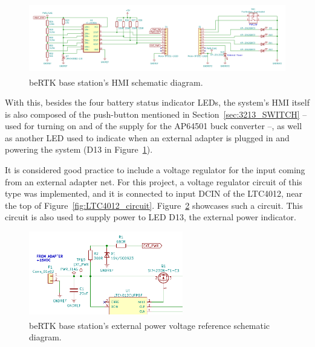 \begin{figure}[h]
	\centering
	\includegraphics[width=1.0\textwidth]{Chapters/Figures/chapter3/Back_Panel.pdf}
	\caption{beRTK\textsuperscript{\textregistered} base station's HMI schematic diagram.}
	\label{fig:HMI_circuit}
\end{figure}

With this, besides the four battery status indicator LEDs, the system's HMI itself is also composed of the push-button mentioned in Section~\ref{sec:3213_SWITCH} -- used for turning on and of the supply for the AP64501 buck converter --, as well as another LED used to indicate when an external adapter is plugged in and powering the system (D13 in Figure~\ref{fig:HMI_circuit}).

It is considered good practice to include a voltage regulator for the input coming from an external adapter net. For this project, a voltage regulator circuit of this type was implemented, and it is connected to input DCIN of the LTC4012, near the top of Figure~\ref{fig:LTC4012_circuit}. Figure~\ref{fig:EXT_PWR} showcases such a circuit. This circuit is also used to supply power to LED D13, the external power indicator.

\begin{figure}[h]
	\centering
	\includegraphics[width=0.6\textwidth]{Chapters/Figures/chapter3/EXT_PWR.pdf}
	\caption{beRTK\textsuperscript{\textregistered} base station's external power voltage reference schematic diagram.}
	\label{fig:EXT_PWR}
\end{figure}

